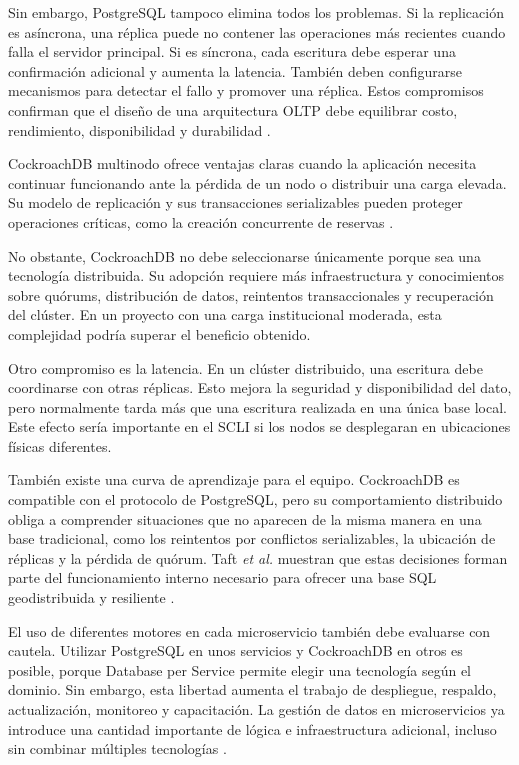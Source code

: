 \documentclass[conference]{IEEEtran}
\begin{document}
Sin embargo, PostgreSQL tampoco elimina todos los problemas. Si la replicación es asíncrona, una réplica puede no contener las operaciones más recientes cuando falla el servidor principal. Si es síncrona, cada escritura debe esperar una confirmación adicional y aumenta la latencia. También deben configurarse mecanismos para detectar el fallo y promover una réplica. Estos compromisos confirman que el diseño de una arquitectura OLTP debe equilibrar costo, rendimiento, disponibilidad y durabilidad \cite{ref12}.

CockroachDB multinodo ofrece ventajas claras cuando la aplicación necesita continuar funcionando ante la pérdida de un nodo o distribuir una carga elevada. Su modelo de replicación y sus transacciones serializables pueden proteger operaciones críticas, como la creación concurrente de reservas \cite{ref13}.

No obstante, CockroachDB no debe seleccionarse únicamente porque sea una tecnología distribuida. Su adopción requiere más infraestructura y conocimientos sobre quórums, distribución de datos, reintentos transaccionales y recuperación del clúster. En un proyecto con una carga institucional moderada, esta complejidad podría superar el beneficio obtenido.

Otro compromiso es la latencia. En un clúster distribuido, una escritura debe coordinarse con otras réplicas. Esto mejora la seguridad y disponibilidad del dato, pero normalmente tarda más que una escritura realizada en una única base local. Este efecto sería importante en el SCLI si los nodos se desplegaran en ubicaciones físicas diferentes.

También existe una curva de aprendizaje para el equipo. CockroachDB es compatible con el protocolo de PostgreSQL, pero su comportamiento distribuido obliga a comprender situaciones que no aparecen de la misma manera en una base tradicional, como los reintentos por conflictos serializables, la ubicación de réplicas y la pérdida de quórum. Taft \textit{et al.} muestran que estas decisiones forman parte del funcionamiento interno necesario para ofrecer una base SQL geodistribuida y resiliente \cite{ref13}.

El uso de diferentes motores en cada microservicio también debe evaluarse con cautela. Utilizar PostgreSQL en unos servicios y CockroachDB en otros es posible, porque Database per Service permite elegir una tecnología según el dominio. Sin embargo, esta libertad aumenta el trabajo de despliegue, respaldo, actualización, monitoreo y capacitación. La gestión de datos en microservicios ya introduce una cantidad importante de lógica e infraestructura adicional, incluso sin combinar múltiples tecnologías \cite{ref2}.
\end{document}
